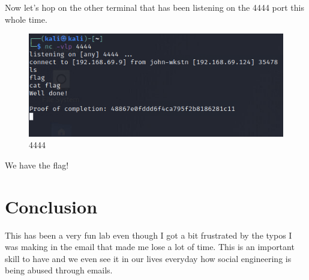 Now let's hop on the other terminal that has been listening on the 4444 port
this whole time.

\begin{figure}[H]
  \centering
  \includegraphics[width=1\textwidth]{figures/4444}
  \caption{4444}
  \label{f:4444}
\end{figure}

We have the flag!

\section{Conclusion}
This has been a very fun lab even though I got a bit frustrated by the typos I
was making in the email that made me lose a lot of time. This is an important
skill to have and we even see it in our lives everyday how social engineering is
being abused through emails.


